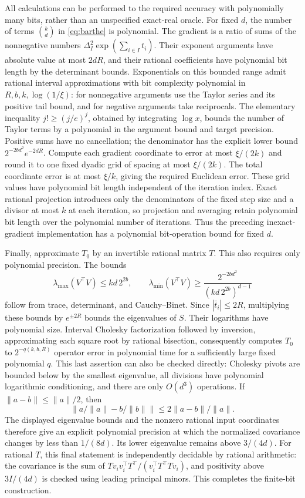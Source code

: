 All calculations can be performed to the required accuracy with polynomially many bits, rather than an unspecified exact-real oracle. For fixed $d$, the number of terms $\binom kd$ in \eqref{eq:barthe} is polynomial. The gradient is a ratio of sums of the nonnegative numbers $\Delta_I^2\exp(\sum_{i\in I}t_i)$. Their exponent arguments have absolute value at most $2dR$, and their rational coefficients have polynomial bit length by the determinant bounds. Exponentials on this bounded range admit rational interval approximations with bit complexity polynomial in $R,b,k,\log(1/\xi)$: for nonnegative arguments use the Taylor series and its positive tail bound, and for negative arguments take reciprocals. The elementary inequality $j!\ge(j/e)^j$, obtained by integrating $\log x$, bounds the number of Taylor terms by a polynomial in the argument bound and target precision. Positive sums have no cancellation; the denominator has the explicit lower bound $2^{-2bd^2}e^{-2dR}$. Compute each gradient coordinate to error at most $\xi/(2k)$ and round it to one fixed dyadic grid of spacing at most $\xi/(2k)$. The total coordinate error is at most $\xi/k$, giving the required Euclidean error. These grid values have polynomial bit length independent of the iteration index. Exact rational projection introduces only the denominators of the fixed step size and a divisor at most $k$ at each iteration, so projection and averaging retain polynomial bit length over the polynomial number of iterations. Thus the preceding inexact-gradient implementation has a polynomial bit-operation bound for fixed $d$.

Finally, approximate $T_0$ by an invertible rational matrix $T$. This also requires only polynomial precision. The bounds
\[
 \lambda_{\max}(V^\top V)\le kd\,2^{2b},\qquad
 \lambda_{\min}(V^\top V)\ge
 \frac{2^{-2bd^2}}{(kd\,2^{2b})^{d-1}}
\]
follow from trace, determinant, and Cauchy--Binet. Since $|\bar t_i|\le2R$, multiplying these bounds by $e^{\pm2R}$ bounds the eigenvalues of $S$. Their logarithms have polynomial size. Interval Cholesky factorization followed by inversion, approximating each square root by rational bisection, consequently computes $T_0$ to $2^{-q(k,b,R)}$ operator error in polynomial time for a sufficiently large fixed polynomial $q$. This last assertion can also be checked directly: Cholesky pivots are bounded below by the smallest eigenvalue, all divisions have polynomial logarithmic conditioning, and there are only $O(d^3)$ operations. If $\|a-b\|\le\|a\|/2$, then
\[
 \left\|a/\|a\|-b/\|b\|\right\|\le2\|a-b\|/\|a\|.
\]
The displayed eigenvalue bounds and the nonzero rational input coordinates therefore give an explicit polynomial precision at which the normalized covariance changes by less than $1/(8d)$. Its lower eigenvalue remains above $3/(4d)$. For rational $T$, this final statement is independently decidable by rational arithmetic: the covariance is the sum of $Tv_iv_i^\top T^\top/(v_i^\top T^\top Tv_i)$, and positivity above $3I/(4d)$ is checked using leading principal minors. This completes the finite-bit construction.

